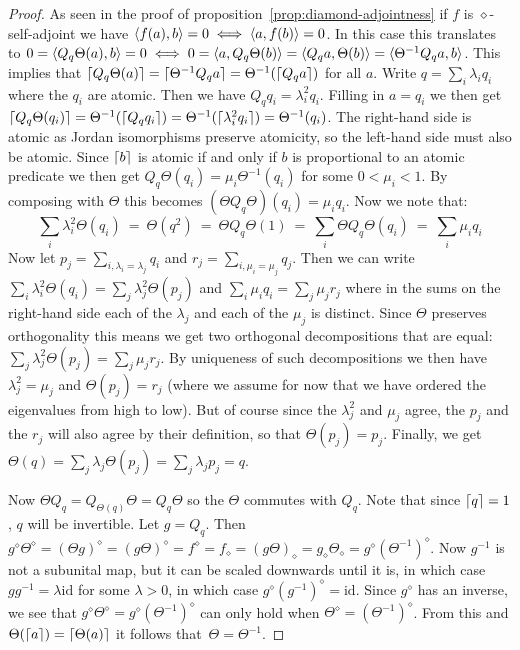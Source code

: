 \documentclass[submission,copyright,creativecommons]{eptcs}
\theoremstyle{definition}
\DeclarePairedDelimiter{\ceil}{\lceil}{\rceil}
\DeclarePairedDelimiter{\inn}{\langle}{\rangle}
\newcommand{\id}{\mathrm{id}}
\begin{document}
\begin{proof}
	As seen in the proof of proposition~\ref{prop:diamond-adjointness} 
    if $f$ is
	$\diamond$-self-adjoint we have $\inn{f(a),b}=0 \iff
	\inn{a,f(b)}=0$. In this case this translates to
	$0=\inn{Q_q\Theta(a),b}=0 \iff 0=\inn{a,Q_q\Theta(b)} =
	\inn{Q_qa,\Theta(b)} = \inn{\Theta^{-1}Q_qa,b}$. This implies
	that $\ceil{Q_q\Theta(a)} = \ceil{\Theta^{-1}Q_qa} =
	\Theta^{-1}(\ceil{Q_qa})$ for all $a$. Write $q=\sum_i\lambda_i
	q_i$ where the $q_i$ are atomic. Then we have $Q_qq_i =
	\lambda_i^2 q_i$. Filling in $a=q_i$ we then get
	$\ceil{Q_q\Theta(q_i)} = \Theta^{-1}(\ceil{Q_qq_i}) =
	\Theta^{-1}(\ceil{\lambda_i^2 q_i}) = \Theta^{-1}(q_i)$.
	The right-hand side is atomic as Jordan isomorphisms preserve
	atomicity, so the left-hand side must also be atomic. Since
	$\ceil{b}$ is atomic if and only if $b$ is proportional to
	an atomic predicate we then get $Q_q\Theta(q_i) = \mu_i
	\Theta^{-1}(q_i)$ for some $0<\mu_i<1$. By composing with $\Theta$ this becomes $(\Theta Q_q \Theta)(q_i) = \mu_i q_i$. Now we note that:
    \begin{equation*}
	\sum_i\lambda_i^2 \Theta(q_i) \ = \  \Theta(q^2) \ = \
	\Theta Q_q \Theta(1) \ = \  \sum_i \Theta Q_q \Theta (q_i)
	\ = \  \sum_i \mu_i q_i
    \end{equation*}
	Now let $p_j = \sum_{i, \lambda_i=\lambda_j} q_i$ and $r_j = \sum_{i, \mu_i=\mu_j} q_j$. 
    Then we can write $\sum_i \lambda_i^2 \Theta(q_i) = \sum_j \lambda_j^2 \Theta(p_j)$ and $\sum_i \mu_i q_i = \sum_j \mu_j r_j$ 
    where in the sums on the right-hand side each of the $\lambda_j$ and each of the $\mu_j$ is distinct. 
    Since $\Theta$ preserves orthogonality this means we get two orthogonal decompositions that are equal: $\sum_j \lambda_j^2 \Theta(p_j) = \sum_j \mu_j r_j$. 
    By uniqueness of such decompositions we then have $\lambda_j^2 =\mu_j$ and $\Theta(p_j) = r_j$ (where we assume for now that we have ordered the eigenvalues from high to low). 
    But of course since the $\lambda_j^2$ and $\mu_j$ agree, the $p_j$ and the $r_j$ will also agree by their definition, so that $\Theta(p_j) = p_j$. Finally, we get $\Theta(q) = \sum_j \lambda_j \Theta(p_j) = \sum_j\lambda_j p_j = q$.

	Now $\Theta Q_q =  Q_{\Theta(q)}\Theta = Q_q\Theta$ so the
	$\Theta$ commutes with $Q_q$. Note that since $\ceil{q}=1$,
	$q$ will be invertible. Let $g = Q_q$. Then $g^\diamond
	\Theta^\diamond = (\Theta g)^\diamond = (g\Theta)^\diamond
	= f^\diamond = f_\diamond = (g\Theta)_\diamond = g_\diamond
	\Theta_\diamond = g^\diamond (\Theta^{-1})^\diamond$. Now
	$g^{-1}$ is not a subunital map, but it can be scaled
	downwards until it is, in which case $gg^{-1} = \lambda
	\id$ for some $\lambda>0$, in which case $g^\diamond
	(g^{-1})^\diamond = \id$. Since $g^\diamond$ has an inverse,
	we see that $g^\diamond \Theta^\diamond = g^\diamond
	(\Theta^{-1})^\diamond$ can only hold when $\Theta^\diamond
    = (\Theta^{-1})^\diamond$. From this and $\Theta(\ceil{a}) = \ceil{\Theta(a)}$
        it follows that~$\Theta=\Theta^{-1}$.
\end{proof}
\end{document}
